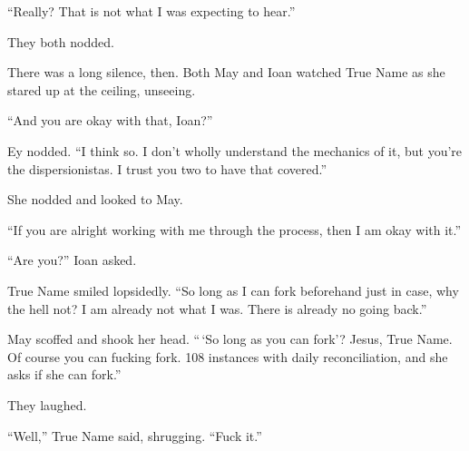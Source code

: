 ``Really? That is not what I was expecting to hear.''

They both nodded.

There was a long silence, then. Both May and Ioan watched True Name as she stared up at the ceiling, unseeing.

``And you are okay with that, Ioan?''

Ey nodded. ``I think so. I don't wholly understand the mechanics of it, but you're the dispersionistas. I trust you two to have that covered.''

She nodded and looked to May.

``If you are alright working with me through the process, then I am okay with it.''

``Are you?'' Ioan asked.

True Name smiled lopsidedly. ``So long as I can fork beforehand just in case, why the hell not? I am already not what I was. There is already no going back.''

May scoffed and shook her head. ``\,`So long as you can fork'? Jesus, True Name. Of course you can fucking fork. 108 instances with daily reconciliation, and she asks if she can fork.''

They laughed.

``Well,'' True Name said, shrugging. ``Fuck it.''
